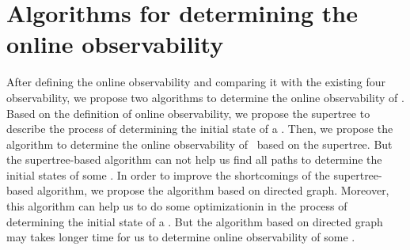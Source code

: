 \section{Algorithms for determining the online observability}
\label{sec:deter}
After defining the online observability and comparing it with the existing four observability, we propose two algorithms to determine the online observability of \BCNs. Based on the definition of online observability, we propose the supertree to describe the process of determining the initial state of a \BCN. Then, we propose the algorithm to determine the online observability of \BCNs\ based on the supertree. But the supertree-based algorithm can not help us find all paths to determine the initial states of some \BCNs. In order to improve the shortcomings of the supertree-based algorithm, we propose the algorithm based on directed graph. Moreover, this algorithm can help us to do some optimizationin in the process of determining the initial state of a \BCN. But the algorithm based on directed graph may takes longer time for us to determine online observability of some \BCNs. 

